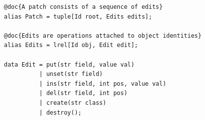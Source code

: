 
\begin{lstlisting}[label=lst:delta-adt, caption={CRUD-like patch definition in Rascal.}, language=Rascal, float=tb, numbers=none, xleftmargin=4pt, aboveskip=0pt, belowskip=0pt, belowcaptionskip=0pt, frame=single, linewidth=.81\columnwidth]
@doc{A patch consists of a sequence of edits}
alias Patch = tuple[Id root, Edits edits];

@doc{Edits are operations attached to object identities}
alias Edits = lrel[Id obj, Edit edit];

data Edit = put(str field, value val)
          | unset(str field)
          | ins(str field, int pos, value val)
          | del(str field, int pos)
          | create(str class) 
          | destroy();
\end{lstlisting}
